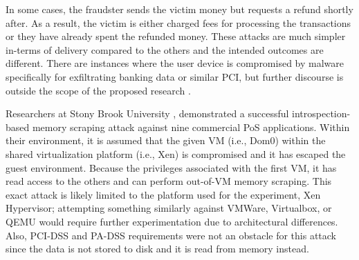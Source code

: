 In some cases, the fraudster sends the victim money but requests a refund shortly after. As a result, the victim is either charged fees for processing the transactions or they have already spent the refunded money. These attacks are much simpler in-terms of delivery compared to the others and the intended outcomes are different. There are instances where the user device is compromised by malware specifically for exfiltrating banking data or similar PCI, but further discourse is outside the scope of the proposed research \autocite{darvishSecurityAnalysisMobile2018}.

Researchers at Stony Brook University \autocite{hizverIntrospectionBasedMemoryScraper2012a}, demonstrated a successful introspection-based memory scraping attack against nine commercial PoS applications. Within their environment, it is assumed that the given VM (i.e., Dom0) within the shared virtualization platform (i.e., Xen) is compromised and it has escaped the guest environment. Because the privileges associated with the first VM, it has read access to the others and can perform out-of-VM memory scraping. This exact attack is likely limited to the platform used for the experiment, Xen Hypervisor; attempting something similarly against VMWare, Virtualbox, or QEMU would require further experimentation due to architectural differences. Also, PCI-DSS and PA-DSS requirements were not an obstacle for this attack since the data is not stored to disk and it is read from memory instead. 




